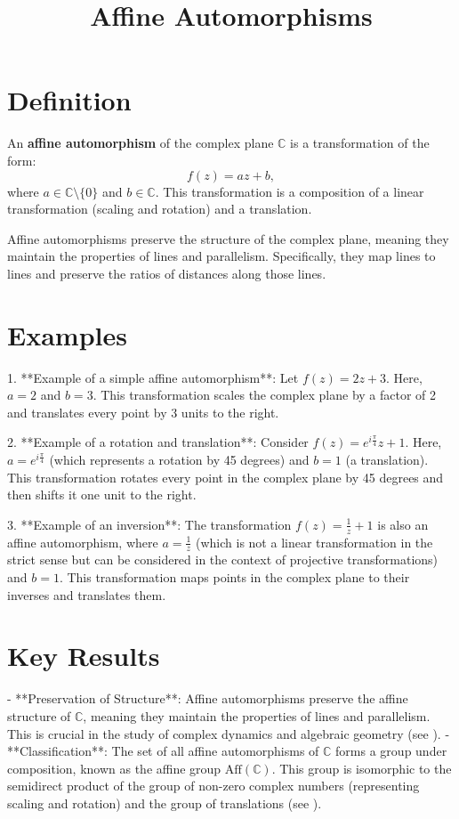 \documentclass[11pt,a4paper]{article}
\title{Affine Automorphisms}
\date{}
\begin{document}
\maketitle
\section{Definition}
An \textbf{affine automorphism} of the complex plane $\mathbb{C}$ is a transformation of the form:
$$
f(z) = az + b,
$$
where $a \in \mathbb{C} \setminus \{0\}$ and $b \in \mathbb{C}$. This transformation is a composition of a linear transformation (scaling and rotation) and a translation. 

Affine automorphisms preserve the structure of the complex plane, meaning they maintain the properties of lines and parallelism. Specifically, they map lines to lines and preserve the ratios of distances along those lines.

\section{Examples}
1. **Example of a simple affine automorphism**:
   Let $f(z) = 2z + 3$. Here, $a = 2$ and $b = 3$. This transformation scales the complex plane by a factor of 2 and translates every point by 3 units to the right.

2. **Example of a rotation and translation**:
   Consider $f(z) = e^{i\frac{\pi}{4}}z + 1$. Here, $a = e^{i\frac{\pi}{4}}$ (which represents a rotation by 45 degrees) and $b = 1$ (a translation). This transformation rotates every point in the complex plane by 45 degrees and then shifts it one unit to the right.

3. **Example of an inversion**:
   The transformation $f(z) = \frac{1}{z} + 1$ is also an affine automorphism, where $a = \frac{1}{z}$ (which is not a linear transformation in the strict sense but can be considered in the context of projective transformations) and $b = 1$. This transformation maps points in the complex plane to their inverses and translates them.

\section{Key Results}
- **Preservation of Structure**: Affine automorphisms preserve the affine structure of $\mathbb{C}$, meaning they maintain the properties of lines and parallelism. This is crucial in the study of complex dynamics and algebraic geometry (see \cite{arxiv:2601.19274}).
- **Classification**: The set of all affine automorphisms of $\mathbb{C}$ forms a group under composition, known as the affine group $\text{Aff}(\mathbb{C})$. This group is isomorphic to the semidirect product of the group of non-zero complex numbers (representing scaling and rotation) and the group of translations (see \cite{arxiv:2601.19274}).
\end{document}
